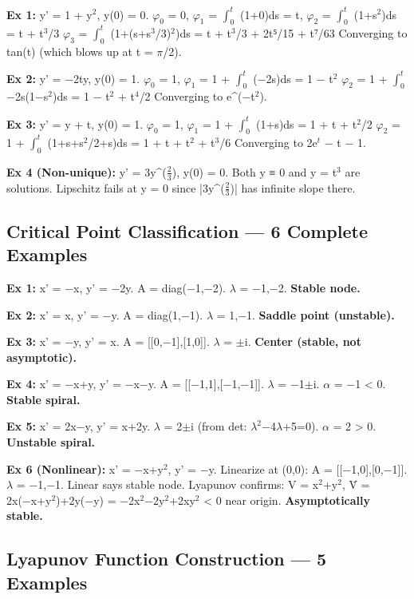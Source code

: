 \documentclass[12pt,a4paper,openany]{book}
\begin{document}
{{\textbf{Ex 1:} y' = 1 + y$^2$, y(0) = 0.
$\varphi_0$ = 0, $\varphi_1$ = $\int_0^t$ (1+0)ds = t, $\varphi_2$ = $\int_0^t$ (1+s$^2$)ds = t + t$^3$/3
$\varphi_3$ = $\int_0^t$ (1+(s+s$^3$/3)$^2$)ds = t + t$^3$/3 + 2t⁵/15 + t⁷/63
Converging to tan(t) (which blows up at t = $\pi$/2).

\textbf{Ex 2:} y' = −2ty, y(0) = 1.
$\varphi_0$ = 1, $\varphi_1$ = 1 + $\int_0^t$ (−2s)ds = 1 − t$^2$
$\varphi_2$ = 1 + $\int_0^t$ −2s(1−s$^2$)ds = 1 − t$^2$ + t$^4$/2
Converging to e^(−t$^2$).

\textbf{Ex 3:} y' = y + t, y(0) = 1.
$\varphi_0$ = 1, $\varphi_1$ = 1 + $\int_0^t$ (1+s)ds = 1 + t + t$^2$/2
$\varphi_2$ = 1 + $\int_0^t$ (1+s+s$^2$/2+s)ds = 1 + t + t$^2$ + t$^3$/6
Converging to 2e$^t$ − t − 1.

\textbf{Ex 4 (Non-unique):} y' = 3y^($\frac{2}{3}$), y(0) = 0.
Both y ≡ 0 and y = t$^3$ are solutions. Lipschitz fails at y = 0 since |3y^($\frac{2}{3}$)| has infinite slope there.

\subsection{Critical Point Classification — 6 Complete Examples}

\textbf{Ex 1:} x' = −x, y' = −2y. A = diag(−1,−2). $\lambda$ = −1,−2. \textbf{Stable node.}

\textbf{Ex 2:} x' = x, y' = −y. A = diag(1,−1). $\lambda$ = 1,−1. \textbf{Saddle point (unstable).}

\textbf{Ex 3:} x' = −y, y' = x. A = [[0,−1],[1,0]]. $\lambda$ = $\pm$i. \textbf{Center (stable, not asymptotic).}

\textbf{Ex 4:} x' = −x+y, y' = −x−y. A = [[−1,1],[−1,−1]]. $\lambda$ = −1$\pm$i. $\alpha$ = −1 < 0. \textbf{Stable spiral.}

\textbf{Ex 5:} x' = 2x−y, y' = x+2y. $\lambda$ = 2$\pm$i (from det: $\lambda^2$−4$\lambda$+5=0). $\alpha$ = 2 > 0. \textbf{Unstable spiral.}

\textbf{Ex 6 (Nonlinear):} x' = −x+y$^2$, y' = −y. Linearize at (0,0): A = [[−1,0],[0,−1]]. $\lambda$ = −1,−1. Linear says stable node. Lyapunov confirms: V = x$^2$+y$^2$, V̇ = 2x(−x+y$^2$)+2y(−y) = −2x$^2$−2y$^2$+2xy$^2$ < 0 near origin. \textbf{Asymptotically stable.} 

\subsection{Lyapunov Function Construction — 5 Examples}

}}
\end{document}
